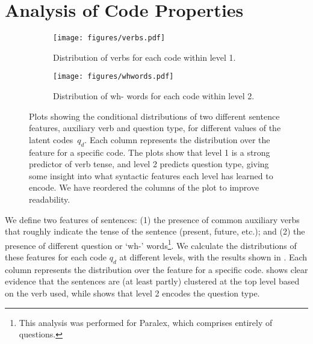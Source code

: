 \documentclass[11pt]{article}
\begin{document}
\section{Analysis of Code Properties}


\begin{figure}[t!]
    \centering
    \begin{subfigure}{0.44\textwidth}
        \raggedleft
        \texttt{[image: figures/verbs.pdf]}
        \caption{Distribution of verbs for each code within level 1.}
        \label{fig:verbs}
    \end{subfigure} \begin{subfigure}{0.46\textwidth}
        \raggedleft
        \texttt{[image: figures/whwords.pdf]}
        \caption{Distribution of wh- words for each code within level 2.}
        \label{fig:whwords}
    \end{subfigure}


    \caption{Plots showing the conditional distributions of two
      different sentence features, auxiliary verb and question type,
      for different values of the latent codes~$q_d$. Each column
      represents the distribution over the feature for a specific
      code. The plots show that level 1 is a strong predictor of verb
      tense, and level 2 predicts question type, giving some insight
      into what syntactic features each level has learned to
      encode. We have reordered the columns of the plot to improve
      readability.}
\label{fig:heads}
\end{figure}

We define two
features of sentences: (1) the presence of common auxiliary verbs that
roughly indicate the tense of the sentence (present, future, etc.);
and (2) the presence of different question or `wh-'
words\footnote{This analysis was performed for Paralex, which
  comprises entirely of questions.}. We calculate the distributions of
these features for each code $q_d$ at different levels, with the
results shown in . Each column represents the
distribution over the feature for a specific code. 
shows clear evidence that the sentences are (at least partly)
clustered at the top level based on the verb used, while
 shows that level 2 encodes the question type.
\end{document}
